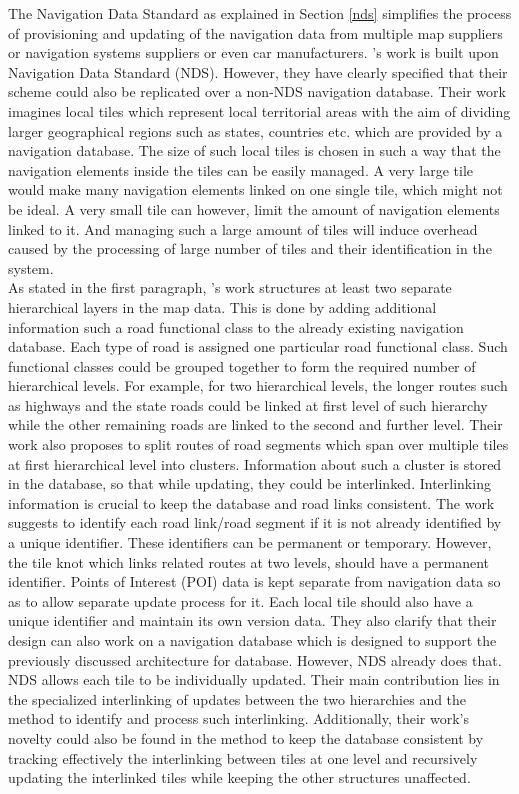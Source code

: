 The Navigation Data Standard as explained in Section \ref{nds} simplifies the process of provisioning and updating of the navigation data from multiple map suppliers or navigation systems suppliers or even car manufacturers. \citet{fischer2012technique}'s work is built upon Navigation Data Standard (NDS). However, they have clearly specified that their scheme could also be replicated over a non-NDS navigation database. Their work imagines local tiles which represent local territorial areas with the aim of dividing larger geographical regions such as states, countries etc. which are provided by a navigation database. The size of such local tiles is chosen in such a way that the navigation elements inside the tiles can be easily managed. A very large tile would make many navigation elements linked on one single tile, which might not be ideal. A very small tile can however, limit the amount of navigation elements linked to it. And managing such a large amount of tiles will induce overhead caused by the processing of large number of tiles and their identification in the system. \\

As stated in the first paragraph, \citet{fischer2012technique}'s work structures at least two separate hierarchical layers in the map data. This is done by adding additional information such a road functional class to the already existing navigation database. Each type of road is assigned one particular road functional class. Such functional classes could be grouped together to form the required number of hierarchical levels. For example, for two hierarchical levels, the longer routes such as highways and the state roads could be linked at first level of such hierarchy while the other remaining roads are linked to the second and further level. Their work also proposes to split routes of road segments which span over multiple tiles at first hierarchical level into clusters. Information about such a cluster is stored in the database, so that while updating, they could be interlinked. Interlinking information is crucial to keep the database and road links consistent. The work suggests to identify each road link/road segment if it is not already identified by a unique identifier. These identifiers can be permanent or temporary. However, the tile knot which links related routes at two levels, should have a permanent identifier. Points of Interest (POI) data is kept separate from navigation data so as to allow separate update process for it. Each local tile should also have a unique identifier and maintain its own version data. They also clarify that their design can also work on a navigation database which is designed to support the previously discussed architecture for database. However, NDS already does that. NDS allows each tile to be individually updated. Their main contribution lies in the specialized interlinking of updates between the two hierarchies and the method to identify and process such interlinking. Additionally, their work's novelty could also be found in the method to keep the database consistent by tracking effectively the interlinking between tiles at one level and recursively updating the interlinked tiles while keeping the other structures unaffected.     

